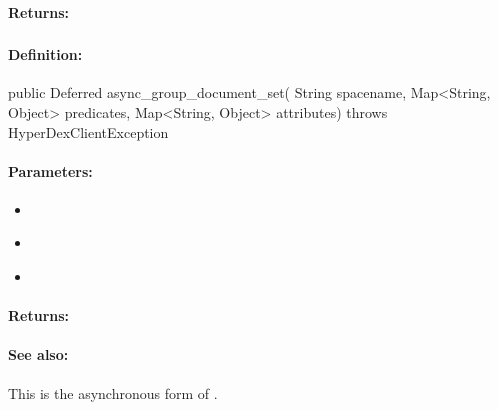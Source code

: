 \paragraph{Returns:}


\pagebreak
\subsubsection{}
\label{api:java:async_group_document_set}


\paragraph{Definition:}
\begin{javacode}
public Deferred async_group_document_set(
        String spacename,
        Map<String, Object> predicates,
        Map<String, Object> attributes) throws HyperDexClientException
\end{javacode}

\paragraph{Parameters:}
\begin{itemize}[noitemsep]
\item {}\\

\item {}\\

\item {}\\

\end{itemize}

\paragraph{Returns:}


\paragraph{See also:}  This is the asynchronous form of .

